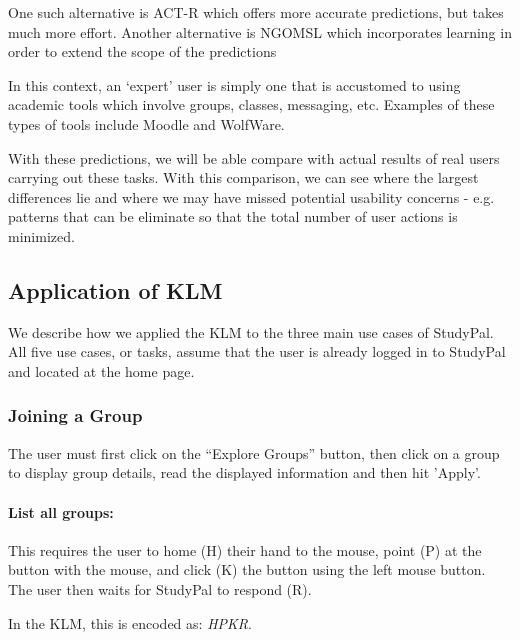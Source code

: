 \documentclass[conference]{IEEEtran}
\begin{document}
One such alternative is ACT-R\cite{Anderson:ACT-R} which offers more accurate predictions, but takes much more effort.
Another alternative is NGOMSL\cite{Kieras:NGOMSL} which incorporates learning in order to extend the scope of the predictions

In this context, an `expert' user is simply one that is accustomed to using academic tools which involve groups, classes, messaging, etc.  Examples of these types of tools include Moodle and WolfWare.

With these predictions, we will be able compare with actual results of real users carrying out these tasks.  With this comparison, we can see where the largest differences lie and where we may have missed potential usability concerns - e.g. patterns that can be eliminate so that the total number of user actions is minimized.


\subsection{Application of KLM}
We describe how we applied the KLM to the three main use cases of StudyPal.
All five use cases, or tasks, assume that the user is already logged in to StudyPal and located at the home page.

\subsubsection{Joining a Group}
The user must first click on the ``Explore Groups'' button, then click on a group to display group details, read the displayed information and then hit 'Apply'.

\paragraph{List all groups:}
This requires the user to home (H) their hand to the mouse, point (P) at the button with the mouse, and click (K) the button using the left mouse button.
The user then waits for StudyPal to respond (R).

In the KLM, this is encoded as: \emph{HPKR}.
\end{document}
